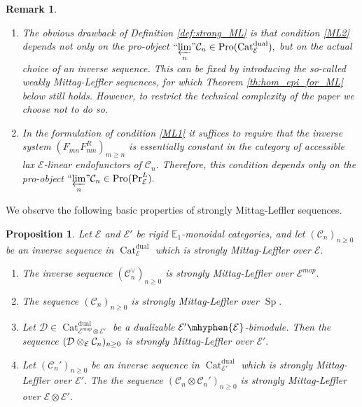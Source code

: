 \documentclass[11pt,leqno]{amsart}
\newtheorem{prop}[theo]{Proposition}
\newtheorem{remark}[theo]{Remark}
\numberwithin{equation}{section}
\newcommand{\tens}[1]{%
  \mathbin{\mathop{\otimes}\displaylimits_{#1}}%
}
\newcommand{\hy}{\mhyphen}
\newcommand{\prolim}[1][]{\mathop{\varprojlim}\limits_{#1}}
\newcommand{\proolim}[1][]{{``{\prolim[#1]}"}}
\newcommand{\Cat}{\operatorname{Cat}}
\newcommand{\dual}{\operatorname{dual}}
\newcommand{\bE}{{\mathbb E}}
\newcommand{\cD}{{\mathcal D}}
\newcommand{\cC}{{\mathcal C}}
\newcommand{\cE}{{\mathcal E}}
\newcommand{\Sp}{\operatorname{Sp}}
\newcommand{\Pro}{\operatorname{Pro}}
\begin{document}
\begin{remark}\label{rem:remarks_on_ML}
	\begin{enumerate}[label=(\roman*),ref=(\roman*)]
\item The obvious drawback of Definition \ref{def:strong_ML} is that condition \ref{ML2} depends not only on the pro-object $\proolim[n]\cC_n\in \Pro(\Cat_{\cE}^{\dual}),$ but on the actual choice of an inverse sequence. This can be fixed by introducing the so-called weakly Mittag-Leffler sequences, for which Theorem \ref{th:hom_epi_for_ML} below still holds. However, to restrict the technical complexity of the paper we choose not to do so.
\item In the formulation of condition \ref{ML1} it suffices to require that the inverse system $(F_{mn}F_{mn}^R)_{m\geq n}$ is essentially constant in the category of accessible lax $\cE$-linear endofunctors of $\cC_n.$ Therefore, this condition depends only on the pro-object $\proolim[n]\cC_n\in\Pro(\Pr^L_{\cE}).$ \label{ML1_depends_only_on_pro_object_of_Pr^L}
\end{enumerate}
\end{remark}

We observe the following basic properties of strongly Mittag-Leffler sequences.

\begin{prop}\label{prop:basic_properties_of_ML}
Let $\cE$ and $\cE'$ be rigid $\bE_1$-monoidal categories, and let $(\cC_n)_{n\geq 0}$ be an inverse sequence in $\Cat_{\cE}^{\dual}$ which is strongly Mittag-Leffler over $\cE.$
\begin{enumerate}[label=(\roman*),ref=(\roman*)]
\item The inverse sequence $(\cC_n^{\vee})_{n\geq 0}$ is strongly Mittag-Leffler over $\cE^{mop}.$ \label{dual_of_ML}
\item The sequence $(\cC_n)_{n\geq 0}$ is strongly Mittag-Leffler over $\Sp.$ \label{relative_ML_implies_absolute}
\item Let $\cD\in\Cat^{\dual}_{\cE^{mop}\otimes\cE'}$ be a dualizable $\cE'\hy\cE$-bimodule. Then the sequence $(\cD\tens{\cE}\cC_n)_{n\geq 0}$ is strongly Mittag-Leffler over $\cE'.$ 
\label{tensoring_ML_with_bimodule}
\item Let $(\cC_n')_{n\geq 0}$ be an inverse sequence in $\Cat_{\cE'}^{\dual}$ which is strongly Mittag-Leffler over $\cE'.$ The the sequence $(\cC_n\otimes\cC_n')_{n\geq 0}$ is strongly Mittag-Leffler over $\cE\otimes\cE'.$ \label{tensor_product_of_ML}
\end{enumerate}
\end{prop}
\end{document}
